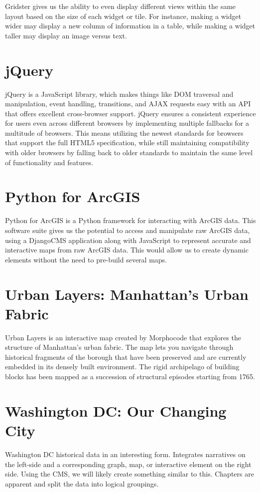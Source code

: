 \documentclass[conference]{IEEEtran}
\begin{document}
Gridster gives us the ability to even display different views within the same layout based on the size of each widget or tile.  For instance, making a widget wider may display a new column of information in a table, while making a widget taller may display an image versus text.

\section{jQuery~\cite{jquery-2014}}

jQuery is a JavaScript library, which makes things like DOM traversal and manipulation, event handling, transitions, and AJAX requests easy with an API that offers excellent cross-browser support. jQuery ensures a consistent experience for users even across different browsers by implementing multiple fallbacks for a multitude of browsers.  This means utilizing the newest standards for browsers that support the full HTML5 specification, while still maintaining compatibility
with older browsers by falling back to older standards to maintain the same level of functionality and features.

\section{Python for ArcGIS~\cite{arcpy-2014}}

Python for ArcGIS is a Python framework for interacting with ArcGIS data. This software suite gives us the potential to access and manipulate raw ArcGIS data, using a DjangoCMS application along with JavaScript to represent accurate and interactive maps from raw ArcGIS data. This would allow us to create dynamic elements without the need to pre-build several maps.

\section{Urban Layers: Manhattan's Urban Fabric~\cite{urban-layers-2014}}

Urban Layers is an interactive map created by Morphocode that explores the structure of Manhattan's urban fabric. The map lets you navigate through historical fragments of the borough that have been preserved and are currently embedded in its densely built environment. The rigid archipelago of building blocks has been mapped as a succession of structural episodes starting from 1765.

\section{Washington DC: Our Changing City~\cite{dc-changing-2014}}

Washington DC historical data in an interesting form. Integrates narratives on the left-side and a corresponding graph, map, or interactive element on the right side. Using the CMS, we will likely create something similar to this. Chapters are apparent and split the data into logical groupings.



\end{document}
